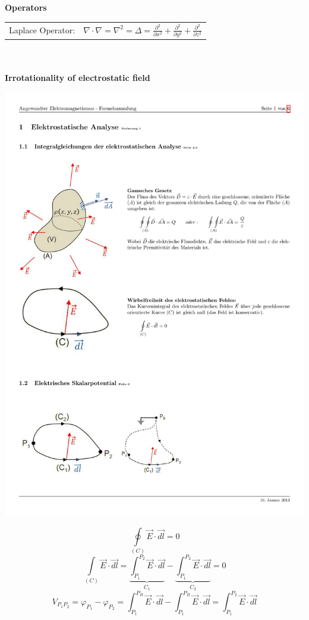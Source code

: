 \textbf{\\ \\ Operators \\} 
\begin{tabular}{ll}
	Laplace Operator: & \(\displaystyle \nabla \cdot \nabla = \nabla^2 = \Delta = \frac{\partial^2}{\partial x^2}+\frac{\partial^2}{\partial y^2}+\frac{\partial^2}{\partial z^2} \) \\
\end{tabular}
\newpage
\textbf{\\ \\ Irrotationality of electrostatic field \\}
\begin{minipage}[lt]{9cm}
	\includegraphics[width=.9\textwidth]{./images/WirbelfreiE2.pdf}
\end{minipage}
\begin{minipage}[rt]{10cm}
	\begin{equation*}
		\oint \limits_{\left(C\right)} \vec{E}\cdot \vec{dl} = 0
	\end{equation*}
	\begin{equation*}
		\int\limits_{\left(C\right)} \vec{E} \cdot \vec{dl} = \underbrace{\int_{P_1}^{P_2} \vec{E} \cdot \vec{dl}}_{C_1} - \underbrace{\int_{P_1}^{P_2} \vec{E} \cdot \vec{dl}}_{C_2} = 0
	\end{equation*}
	\begin{equation*}
		V_{P_1P_2} = \varphi_{P_1} - \varphi_{P_2} = \int_{P_1}^{P_B} \vec{E} \cdot \vec{dl} - \int_{P_1}^{P_B} \vec{E} \cdot \vec{dl} = \int_{P_1}^{P_2} \vec{E} \cdot \vec{dl}
	\end{equation*}
\end{minipage}
